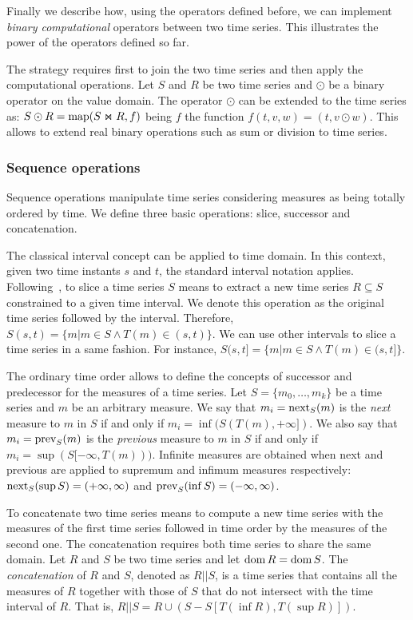 
Finally we describe how, using the operators defined before, we can
implement \emph{binary computational} operators between two time
series. This illustrates the power of the operators defined so far.
%

The strategy requires first to join the two time series and then
apply the computational operations. 
%
Let $S$ and $R$ be two time series and $\odot$ be a binary operator on
the value domain. The operator $\odot$ can be extended to the time
series as:
%
$S\odot R=\operatorname*{map}(S\Join R, f)$ being $f$ the function
$f(t,v,w)=(t,v\odot w)$.
%
This allows to extend real binary operations such as sum or division
to time series.  


\subsubsection{Sequence operations}

Sequence operations manipulate time series considering measures as
being totally ordered by time.  We define three basic operations:
slice, successor and concatenation.


The classical interval concept can be applied to time domain. In this
context, given two time instants $s$ and $t$, the standard interval
notation applies.
%
Following~\cite{last:hetland}, to slice a time series $S$ means to
extract a new time series $R\subseteq S$ constrained to a given time
interval. We denote this operation as the original time series followed
by the interval. Therefore, $S(s,t)=\{m|m\in S \wedge
T(m)\in(s,t)\}$. We can use other intervals to slice a time series in
a same fashion. For instance, $S(s,t]=\{m|m\in S \wedge
T(m)\in(s,t]\}$.

The ordinary time order allows to define the concepts of successor and
predecessor for the measures of a time series.
%
Let $S=\{m_0,\ldots,m_k\}$ be a time series and $m$ be an arbitrary
measure.
%
We say that $m_i=\operatorname*{next}_S(m)$ is the \emph{next} measure to $m$ in $S$ if and
only if $m_i=\inf(S(T(m),+\infty])$.  
%
We also say that $m_i=\operatorname*{prev}_S(m)$ is the \emph{previous} measure to
$m$ in $S$ if and only if $m_i=\sup(S[-\infty,T(m)))$. 
%
Infinite measures are obtained when next and previous are applied to
supremum and infimum measures respectively: $\operatorname*{next}_S(\sup
S)=(+\infty,\infty)$ and $\operatorname*{prev}_S(\inf S)=(-\infty,\infty)$.

To concatenate two time series means to compute a new time series with
the measures of the first time series followed in time order by the
measures of the second one. 
%
The concatenation requires both time series to share the same domain.
Let $R$ and $S$ be two time series and let $\operatorname{dom} R=\operatorname{dom} S$. The
\emph{concatenation} of $R$ and $S$, denoted as $R||S$, is a time
series that contains all the measures of $R$ together with those of
$S$ that do not intersect with the time interval of $R$. That is,
$R||S= R\cup (S - S[T(\inf R),T(\sup R)])$.



